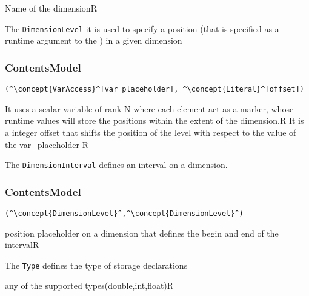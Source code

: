 \HIRContentsModel{ () }
\begin{HIRAttributes}
	{Name of the dimension}{R}
\end{HIRAttributes}


The {\tt DimensionLevel} it is used to specify a position (that is specified as a runtime argument to the ) in a given dimension

\subsubsection*{ContentsModel}{}

\begin{lstlisting}[style=default]
(^\concept{VarAccess}^[var_placeholder], ^\concept{Literal}^[offset])
\end{lstlisting}

\begin{HIRChildElements}
	{It uses a scalar variable of rank N where each element act as a marker, whose runtime values will store the positions within the extent of the dimension.}{R}
	{It is a integer offset that shifts the position of the level with respect to the value of the var\_placeholder }{R}	
\end{HIRChildElements}


The {\tt DimensionInterval} defines an interval on a dimension. 

\subsubsection*{ContentsModel}{}

\begin{lstlisting}[style=default]
(^\concept{DimensionLevel}^,^\concept{DimensionLevel}^)
\end{lstlisting}

\begin{HIRChildElements}
	{position placeholder on a dimension that defines the begin and end of the interval}{R}
\end{HIRChildElements}


The {\tt Type} defines the type of storage declarations
\HIRContentsModel{ () }

\begin{HIRAttributesVal}
	{any of the supported types}{(double,int,float)}{R}
\end{HIRAttributesVal}

